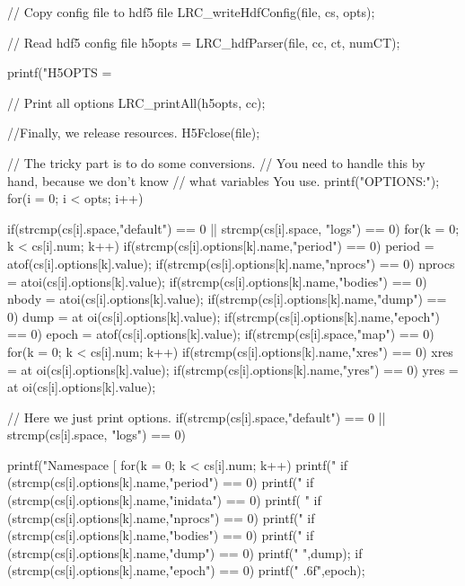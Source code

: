 \begin{DoxyCodeInclude}
{  // Copy config file to hdf5 file
  LRC_writeHdfConfig(file, cs, opts);

  // Read hdf5 config file
  h5opts = LRC_hdfParser(file, cc, ct, numCT);

  printf("H5OPTS = %
  
  // Print all options
  LRC_printAll(h5opts, cc);
 
  //Finally, we release resources.
  H5Fclose(file);
        
        // The tricky part is to do some conversions.
        // You need to handle this by hand, because we don't know
  // what variables You use. 
        printf("\nCONVERTED OPTIONS:\n");
        for(i = 0; i < opts; i++){
    if(strcmp(cs[i].space,"default") == 0 || strcmp(cs[i].space, "logs") == 0){
                  for(k = 0; k < cs[i].num; k++){
                          if(strcmp(cs[i].options[k].name,"period") == 0) period 
      = atof(cs[i].options[k].value);  
                          if(strcmp(cs[i].options[k].name,"nprocs") == 0) nprocs 
      = atoi(cs[i].options[k].value); 
                          if(strcmp(cs[i].options[k].name,"bodies") == 0) nbody =
       atoi(cs[i].options[k].value); 
                          if(strcmp(cs[i].options[k].name,"dump") == 0) dump = at
      oi(cs[i].options[k].value); 
                          if(strcmp(cs[i].options[k].name,"epoch") == 0) epoch = 
      atof(cs[i].options[k].value); 
                  }
          }
    if(strcmp(cs[i].space,"map") == 0){
                  for(k = 0; k < cs[i].num; k++){
                          if(strcmp(cs[i].options[k].name,"xres") == 0) xres = at
      oi(cs[i].options[k].value);  
                          if(strcmp(cs[i].options[k].name,"yres") == 0) yres = at
      oi(cs[i].options[k].value); 
      }
    }


         // Here we just print options.
    if(strcmp(cs[i].space,"default") == 0 || strcmp(cs[i].space, "logs") == 0){
                printf("Namespace [%
                for(k = 0; k < cs[i].num; k++){
                        printf("%
                        if (strcmp(cs[i].options[k].name,"period") == 0) printf("
                        if (strcmp(cs[i].options[k].name,"inidata") == 0) printf(
      "%
                        if (strcmp(cs[i].options[k].name,"nprocs") == 0) printf("
                        if (strcmp(cs[i].options[k].name,"bodies") == 0) printf("
                        if (strcmp(cs[i].options[k].name,"dump") == 0) printf("%
      \n",dump);
                        if (strcmp(cs[i].options[k].name,"epoch") == 0) printf("%
      .6f\n",epoch);
                }
    
}}}
\end{DoxyCodeInclude}
